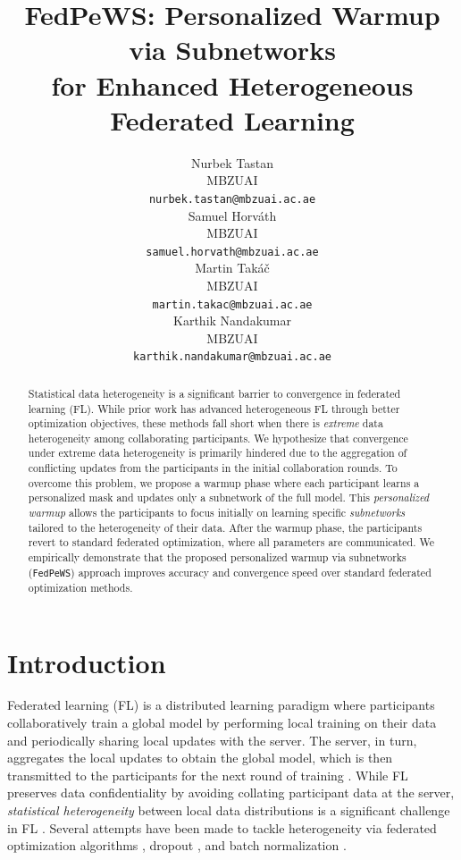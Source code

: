 \documentclass{article}
\title{FedPeWS: Personalized Warmup via Subnetworks \\ for Enhanced Heterogeneous Federated Learning}
\author{%
  Nurbek Tastan\\
  MBZUAI\\ 
  \texttt{nurbek.tastan@mbzuai.ac.ae} \\ 
  \And
  Samuel Horv{\'a}th \\
  MBZUAI \\
  \texttt{samuel.horvath@mbzuai.ac.ae} \\
  \AND
  \hspace{1.05em} Martin Tak{\'a}{\v{c}} \\
  \hspace{1.05em} MBZUAI \\
  \hspace{1.05em} \texttt{martin.takac@mbzuai.ac.ae} \\
  \And
  \hspace{0.1em} Karthik Nandakumar \\
  \hspace{0.1em} MBZUAI \\
  \hspace{0.1em} \texttt{karthik.nandakumar@mbzuai.ac.ae} \\
}
\begin{document}
\maketitle


\begin{abstract}
  Statistical data heterogeneity is a significant barrier to convergence in federated learning (FL). While prior work has advanced heterogeneous FL through better optimization objectives, these methods fall short when there is \textit{extreme} data heterogeneity among collaborating participants. We hypothesize that convergence under extreme data heterogeneity is primarily hindered due to the aggregation of conflicting updates from the participants in the initial collaboration rounds. To overcome this problem, we propose a warmup phase where each participant learns a personalized mask and updates only a subnetwork of the full model. This \textit{personalized warmup} allows the participants to focus initially on learning specific \textit{subnetworks} tailored to the heterogeneity of their data. After the warmup phase, the participants revert to standard federated optimization, where all parameters are communicated. We empirically demonstrate that the proposed personalized warmup via subnetworks (\texttt{FedPeWS}) approach improves accuracy and convergence speed over standard federated optimization methods. 
\end{abstract}


\section{Introduction} 
\label{section: intro}

Federated learning (FL) is a distributed learning paradigm where participants collaboratively train a global model by performing local training on their data and periodically sharing local updates with the server. The server, in turn, aggregates the local updates to obtain the global model, which is then transmitted to the participants for the next round of training \citep{mcmahan2017communication}. While FL preserves data confidentiality by avoiding collating participant data at the server, \textit{statistical heterogeneity} between local data distributions is a significant challenge in FL \citep{kairouz2021advances}. Several attempts have been made to tackle heterogeneity via federated optimization algorithms \citep{wang2019matcha, khaled2019first, li2019convergence, li2020federated, karimireddy2020scaffold,tupitsa2024federated,sadiev2022decentralized,beznosikov2021decentralized}, dropout \citep{horvath2021fjord, alam2022fedrolex}, and batch normalization \citep{li2021fedbn}. 
\end{document}
